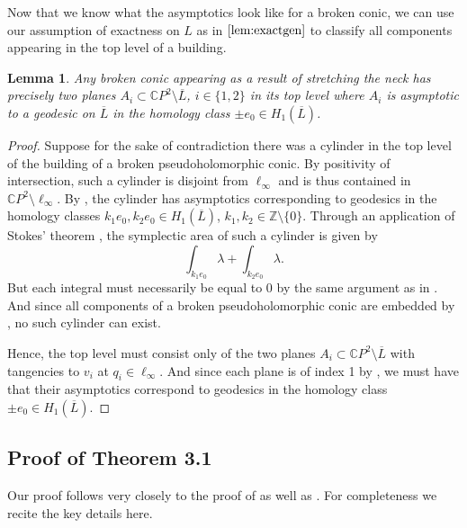 \documentclass[10pt]{amsart}
\theoremstyle{plain}
\newtheorem{lemma}[thm]{Lemma}
\theoremstyle{definition}
\numberwithin{equation}{section}
\newcommand{\Z}{\mathbb{Z}}
\newcommand{\C}{\mathbb{C}}
\newcommand{\sse}{\subset}
\newcommand{\sm}{\setminus}
\begin{document}
Now that we know what the asymptotics look like for a broken conic, we can use our assumption of exactness on $L$ as in $\Cref{lem:exactgen}$ to classify all components appearing in the top level of a building.

\begin{lemma}\label{lem:twotopplanes}
    Any broken conic appearing as a result of stretching the neck has precisely two planes $A_i\sse \C P^2\sm \overline{L}$, $i\in\{1,2\}$ in its top level where $A_i$ is asymptotic to a geodesic on $\overline{L}$ in the homology class $\pm e_0\in H_1(\overline{L})$.
\end{lemma}

\begin{proof}
    Suppose for the sake of contradiction there was a cylinder in the top level of the building of a broken pseudoholomorphic conic. By positivity of intersection, such a cylinder is disjoint from $\ell_\infty$ and is thus contained in $\C P^2 \sm \ell_\infty$. By , the cylinder has asymptotics corresponding to geodesics in the homology classes $k_1 e_0, k_2 e_0\in H_1(\overline{L})$, $k_1,k_2\in \Z\sm \{0\}$. Through an application of Stokes' theorem \cite{Spivak79_DiffGeo}, the symplectic area of such a cylinder is given by
    $$\int_{k_1 e_0} \lambda + \int_{k_2 e_0} \lambda.$$
    But each integral must necessarily be equal to 0 by the same argument as in . And since all components of a broken pseudoholomorphic conic are embedded by \cite[Lemma 5.2]{DR19_WhitneySphere}, no such cylinder can exist. 
    
    Hence, the top level must consist only of the two planes $A_i\subset \C P^2\sm \overline{L}$ with tangencies  to $v_i$ at $q_i\in \ell_\infty$. And since each plane is of index 1 by , we must have that their asymptotics correspond to geodesics in the homology class $\pm e_0\in H_1(\overline{L})$.
\end{proof}








\subsection{Proof of Theorem 3.1}\label{sec:proof_of_fibr}

Our proof follows very closely to the proof of \cite[Theorem 5.12]{DR19_WhitneySphere} as well as \cite[Section 5]{DR16_LagrIsoOfTori}. For completeness we recite the key details here. 
\end{document}
